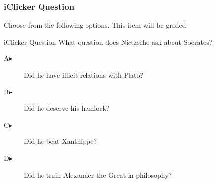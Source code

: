 \begin{frame}
  \frametitle{iClicker Question}
Choose from the following options. This item will be graded.
\begin{block}{iClicker Question}
What question does Nietzsche ask about Socrates?
\end{block}
\begin{description}
\item[A\hspace{.2in}$\blacktriangleright$] Did he have illicit relations with Plato?
\item[B\hspace{.2in}$\blacktriangleright$] Did he deserve his hemlock?
\item[C\hspace{.2in}$\blacktriangleright$] Did he beat Xanthippe?
\item[D\hspace{.2in}$\blacktriangleright$] Did he train Alexander the Great in philosophy?
\end{description}
\end{frame}
